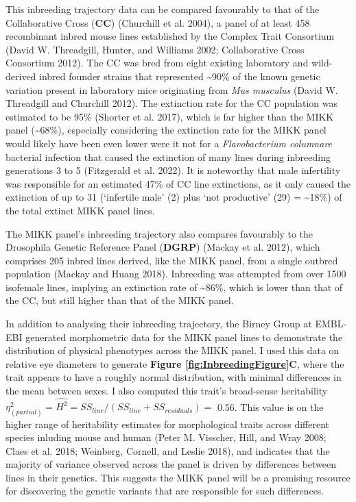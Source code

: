 \documentclass[
]{book}
\begin{document}
This inbreeding trajectory data can be compared favourably to that of the Collaborative Cross (\textbf{CC}) (Churchill et al. 2004), a panel of at least 458 recombinant inbred mouse lines established by the Complex Trait Consortium (David W. Threadgill, Hunter, and Williams 2002; Collaborative Cross Consortium 2012). The CC was bred from eight existing laboratory and wild-derived inbred founder strains that represented \textasciitilde90\% of the known genetic variation present in laboratory mice originating from \emph{Mus musculus} (David W. Threadgill and Churchill 2012). The extinction rate for the CC population was estimated to be 95\% (Shorter et al. 2017), which is far higher than the MIKK panel (\textasciitilde68\%), especially considering the extinction rate for the MIKK panel would likely have been even lower were it not for a \emph{Flavobacterium columnare} bacterial infection that caused the extinction of many lines during inbreeding generations 3 to 5 (Fitzgerald et al. 2022). It is noteworthy that male infertility was responsible for an estimated 47\% of CC line extinctions, as it only caused the extinction of up to 31 (`infertile male' (2) plus `not productive' (29) = \textasciitilde18\%) of the total extinct MIKK panel lines.

The MIKK panel's inbreeding trajectory also compares favourably to the Drosophila Genetic Reference Panel (\textbf{DGRP}) (Mackay et al. 2012), which comprises 205 inbred lines derived, like the MIKK panel, from a single outbred population (Mackay and Huang 2018). Inbreeding was attempted from over 1500 isofemale lines, implying an extinction rate of \textasciitilde86\%, which is lower than that of the CC, but still higher than that of the MIKK panel.

In addition to analysing their inbreeding trajectory, the Birney Group at EMBL-EBI generated morphometric data for the MIKK panel lines to demonstrate the distribution of physical phenotypes across the MIKK panel. I used this data on relative eye diameters to generate \textbf{Figure \ref{fig:InbreedingFigure}C}, where the trait appears to have a roughly normal distribution, with minimal differences in the mean between sexes. I also computed this trait's broad-sense heritability \(\eta^2_{(partial)} = \hat{H^2} = SS_{line} / (SS_{line} + SS_{residuals}) =\) 0.56. This value is on the higher range of heritability estimates for morphological traits across different species inluding mouse and human (Peter M. Visscher, Hill, and Wray 2008; Claes et al. 2018; Weinberg, Cornell, and Leslie 2018), and indicates that the majority of variance observed across the panel is driven by differences between lines in their genetics. This suggests the MIKK panel will be a promising resource for discovering the genetic variants that are responsible for such differences.
\end{document}
